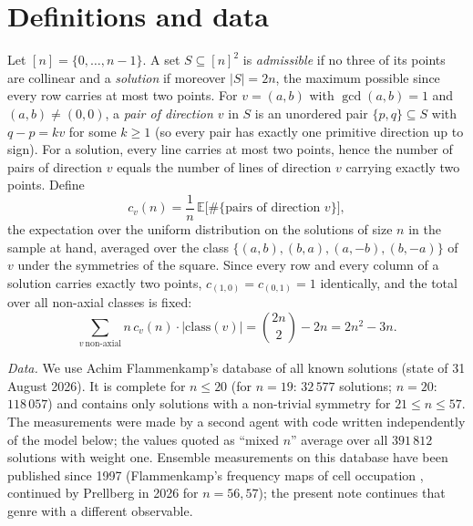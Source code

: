 \documentclass[11pt,a4paper]{article}
\begin{document}
\section{Definitions and data}
Let $[n]=\{0,\dots,n-1\}$.  A set $S\subseteq[n]^2$ is \emph{admissible} if no three of its points are collinear
and a \emph{solution} if moreover $|S|=2n$, the maximum possible since every row carries at most two points.  For
$v=(a,b)$ with $\gcd(a,b)=1$ and $(a,b)\ne(0,0)$, a \emph{pair of direction $v$} in $S$ is an unordered pair
$\{p,q\}\subseteq S$ with $q-p=kv$ for some $k\ge1$ (so every pair has exactly one primitive direction up to sign).
For a solution, every line carries at most two points, hence the number of pairs of direction $v$ equals the number of
lines of direction $v$ carrying exactly two points.  Define
\[c_v(n)=\frac{1}{n}\,\mathbb{E}\bigl[\#\{\text{pairs of direction }v\}\bigr],\]
the expectation over the uniform distribution on the solutions of size $n$ in the sample at hand, averaged over the
class $\{(a,b),(b,a),(a,-b),(b,-a)\}$ of $v$ under the symmetries of the square.  Since every row and every column of a
solution carries exactly two points, $c_{(1,0)}=c_{(0,1)}=1$ identically, and the total over all non-axial classes
is fixed:
\begin{equation}\label{eq:total}
\sum_{v\ \text{non-axial}} n\,c_v(n)\cdot|\text{class}(v)| = \binom{2n}{2}-2n = 2n^2-3n .
\end{equation}

\emph{Data.}  We use Achim Flammenkamp's database of all known solutions (state of 31 August 2026).  It is complete
for $n\le20$ (for $n=19$: $32\,577$ solutions; $n=20$: $118\,057$) and contains only solutions with a non-trivial
symmetry for $21\le n\le57$.  The measurements were made by a second agent with code written independently of the
model below; the values quoted as ``mixed $n$'' average over all $391\,812$ solutions with weight one.  Ensemble
measurements on this database have been published since 1997 (Flammenkamp's frequency maps of cell occupation
\cite{Density}, continued by Prellberg in 2026 for $n=56,57$); the present note continues that genre with a
different observable.
\end{document}
